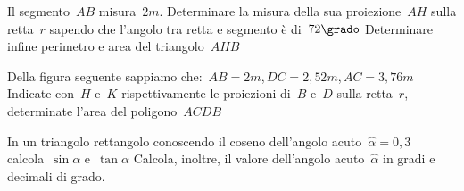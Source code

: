 \begin{multicols}{2}
 \begin{esercizio}
\label{ese:G.12}
Il segmento~\(AB\) misura~\(2\unit{m}\). Determinare la 
misura della sua proiezione~\(AH\) sulla retta~\(r\) sapendo che l'angolo tra retta 
e segmento è di~\(72\grado\) Determinare infine perimetro e area del 
triangolo~\(AHB\)
\begin{center}
\begin{center}\scalebox{1.0}{\proiezioneb}\end{center}
\end{center}
\end{esercizio}

\begin{esercizio}
\label{ese:G.13}
Della figura seguente sappiamo 
che:~\({AB}=2\unit{m}\),\,\({DC}=2,52\unit{m}\),\,\({AC}=3,76\unit{m}\)
Indicate con~\(H\) e~\(K\) rispettivamente le proiezioni di~\(B\) e~\(D\) sulla 
retta~\(r\), determinate l'area del poligono~\(ACDB\)
\begin{center} \scalebox{.9}{\dueproiezioni} \end{center}
\end{esercizio}

%  
%  
%  


\begin{esercizio}
\label{ese:G.15}
In un triangolo rettangolo conoscendo il coseno dell'angolo 
acuto~\(\hat{\alpha}=0,3\) calcola~\(\sin \alpha\) e~\(\tan \alpha\)
Calcola, inoltre, il valore dell'angolo acuto~\(\hat{\alpha}\) in gradi e decimali 
di grado.
\end{esercizio}


\end{multicols}
